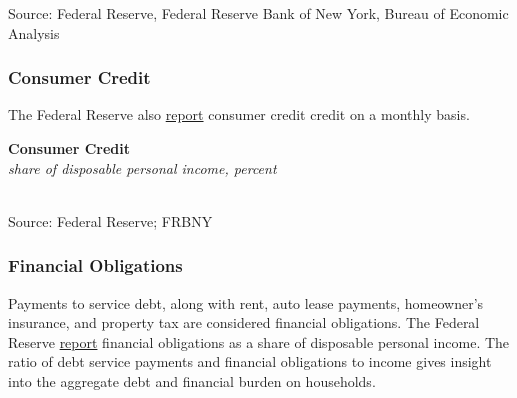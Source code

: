 \documentclass{report}
\makeatletter
\newcommand{\tbllink}[1]{\href{https://raw.githubusercontent.com/bdecon/US-chartbook/master/chartbook/data/#1}{\faTable}}
\newcommand*\short[1]{\expandafter\@gobbletwo\number\numexpr#1\relax}
\newcommand{\stdnode}[3]{\node[below, align=left, shift=({#1,#2})]{#3};}
\newcommand{\dateaxisticks}{
		date coordinates in=x, axis line style={draw=none},
		xmax={2022-01-30},
		max space between ticks=40,	    
		xtick={{1990-01-01}, {1992-01-01}, {1994-01-01}, 
			{1996-01-01}, {1998-01-01}, {2000-01-01}, 
			{2002-01-01}, {2004-01-01}, {2006-01-01},
			{2008-01-01}, {2010-01-01}, {2012-01-01}, {2014-01-01},
		    {2016-01-01}, {2018-01-01}, {2020-01-01}, {2022-01-01}},
		minor xtick={{1989-01-01}, {1991-01-01}, {1993-01-01},
			{1995-01-01}, {1997-01-01}, {1999-01-01}, 
			{2001-01-01}, {2003-01-01}, {2005-01-01}, {2007-01-01},
		    {2009-01-01}, {2011-01-01}, {2013-01-01}, {2015-01-01},
		    {2017-01-01}, {2019-01-01}, {2021-01-01}},
		enlarge y limits={0.06}, enlarge x limits={0.01},
		}
\newcommand{\bbar}[2]{extra #1 ticks = {{#2}}, extra #1 tick labels = ,
		extra #1 tick style = {grid=major, grid style={thick, black!25}},}
\newcommand{\thinline}[4]{\addplot[no markers, color=#1] 
		table [x=#2, y=#3, col sep=comma] {#4};	}
\newcommand{\thickline}[4]{\addplot[ultra thick, no markers, color=#1] 
		table [x=#2, y=#3, col sep=comma] {#4};	}
\newcommand{\rbars}{
		\fill[color=black!10] (axis cs:{1990-07-01},\pgfkeysvalueof{/pgfplots/ymin}) rectangle 
			(axis cs:{1991-03-01}, \pgfkeysvalueof{/pgfplots/ymax});
		\fill[color=black!10] (axis cs:{2007-12-01},\pgfkeysvalueof{/pgfplots/ymin}) rectangle 
			(axis cs:{2009-07-01}, \pgfkeysvalueof{/pgfplots/ymax});
		\fill[color=black!10] (axis cs:{2001-03-01},\pgfkeysvalueof{/pgfplots/ymin}) rectangle 
			(axis cs:{2001-11-01}, \pgfkeysvalueof{/pgfplots/ymax});
		\fill[color=black!10] (axis cs:{2020-02-01},\pgfkeysvalueof{/pgfplots/ymin}) rectangle 
			(axis cs:{2020-05-01}, \pgfkeysvalueof{/pgfplots/ymax});}
\makeatother
\begin{document}
{\begin{minipage}{0.76\textwidth}
\footnotesize{Source: Federal Reserve, Federal Reserve Bank of New York, Bureau of Economic Analysis}
\end{minipage}
\newpage
\begin{minipage}{0.76\textwidth}
\subsubsection*{\color{black!70} \seriffont Consumer Credit}

\small The Federal Reserve also \href{https://www.federalreserve.gov/releases/g19/current/default.htm}{report} consumer credit credit on a monthly basis. 


\vspace{1mm}

\normalsize \textbf{Consumer Credit}\\
\footnotesize{\textit{share of disposable personal income, percent}}\\
\hspace*{-2mm} \\
\footnotesize{Source: Federal Reserve; FRBNY} \hfill \tbllink{cc_dpi_monthly.csv}
\end{minipage}
\vspace{5mm}

\subsubsection*{\color{black!70} \seriffont Financial Obligations}
\begin{minipage}{0.29\textwidth}
\small Payments to service debt, along with rent, auto lease payments, homeowner's insurance, and property tax are considered financial obligations. The Federal Reserve \href{https://www.federalreserve.gov/releases/housedebt/default.htm}{report} financial obligations as a share of disposable personal income. The ratio of debt service payments and financial obligations to income gives insight into the aggregate debt and financial burden on households. 


\end{minipage}}
\end{document}
